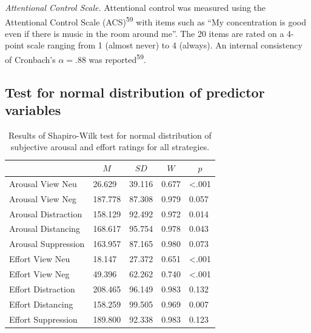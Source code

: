 \documentclass[
  man,floatsintext]{apa6}
\begin{document}
\emph{Attentional Control Scale.} Attentional control was measured using the Attentional Control Scale (ACS)\textsuperscript{59} with items such as ``My concentration is good even if there is music in the room around me''.
The 20 items are rated on a 4-point scale ranging from 1 (almost never) to 4 (always).
An internal consistency of Cronbach's \(\alpha=.88\) was reported\textsuperscript{59}.

\newpage

\hypertarget{SupplementNV}{%
\subsection{Test for normal distribution of predictor variables}\label{SupplementNV}}

\begin{table}[H]

\begin{center}
\begin{threeparttable}

\caption{\label{tab:TabNVRatings}Results of Shapiro-Wilk test for normal distribution of subjective arousal and effort ratings for all strategies.}

\begin{tabular}{lllll}
\toprule
 & \multicolumn{1}{c}{$M$} & \multicolumn{1}{c}{$SD$} & \multicolumn{1}{c}{$W$} & \multicolumn{1}{c}{$p$}\\
\midrule
Arousal View Neu & 26.629 & 39.116 & 0.677 & <.001\\
Arousal View Neg & 187.778 & 87.308 & 0.979 & 0.057\\
Arousal Distraction & 158.129 & 92.492 & 0.972 & 0.014\\
Arousal Distancing & 168.617 & 95.754 & 0.978 & 0.043\\
Arousal Suppression & 163.957 & 87.165 & 0.980 & 0.073\\
Effort View Neu & 18.147 & 27.372 & 0.651 & <.001\\
Effort View Neg & 49.396 & 62.262 & 0.740 & <.001\\
Effort Distraction & 208.465 & 96.149 & 0.983 & 0.132\\
Effort Distancing & 158.259 & 99.505 & 0.969 & 0.007\\
Effort Suppression & 189.800 & 92.338 & 0.983 & 0.123\\
\bottomrule
\end{tabular}

\end{threeparttable}
\end{center}

\end{table}
\end{document}
